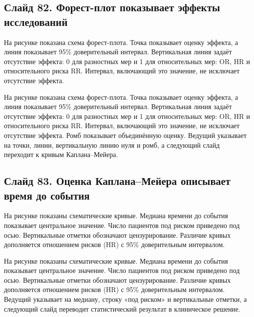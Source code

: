 \documentclass[11pt,a4paper]{article}
\begin{document}
\subsection*{Слайд 82. Форест-плот показывает эффекты исследований}
\begin{onslide}
На рисунке показана схема форест-плота. Точка показывает оценку эффекта, а линия показывает 95\% доверительный интервал. Вертикальная линия задаёт отсутствие эффекта: 0 для разностных мер и 1 для относительных мер: OR, HR и относительного риска RR. Интервал, включающий это значение, не исключает отсутствие эффекта.
\end{onslide}
На рисунке показана схема форест-плота. Точка показывает оценку эффекта, а линия показывает 95\% доверительный интервал. Вертикальная линия задаёт отсутствие эффекта: 0 для разностных мер и 1 для относительных мер: OR, HR и относительного риска RR. Интервал, включающий это значение, не исключает отсутствие эффекта. Ромб показывает объединённую оценку. Ведущий указывает на точки, линии, вертикальную линию нуля и ромб, а следующий слайд переходит к кривым Каплана--Мейера.

\subsection*{Слайд 83. Оценка Каплана–Мейера описывает время до события}
\begin{onslide}
На рисунке показаны схематические кривые. Медиана времени до события показывает центральное значение. Число пациентов под риском приведено под осью. Вертикальные отметки обозначают цензурирование. Различие кривых дополняется отношением рисков (HR) с 95\% доверительным интервалом.
\end{onslide}
На рисунке показаны схематические кривые. Медиана времени до события показывает центральное значение. Число пациентов под риском приведено под осью. Вертикальные отметки обозначают цензурирование. Различие кривых дополняется отношением рисков (HR) с 95\% доверительным интервалом. Ведущий указывает на медиану, строку «под риском» и вертикальные отметки, а следующий слайд переводит статистический результат в клиническое решение.
\end{document}
